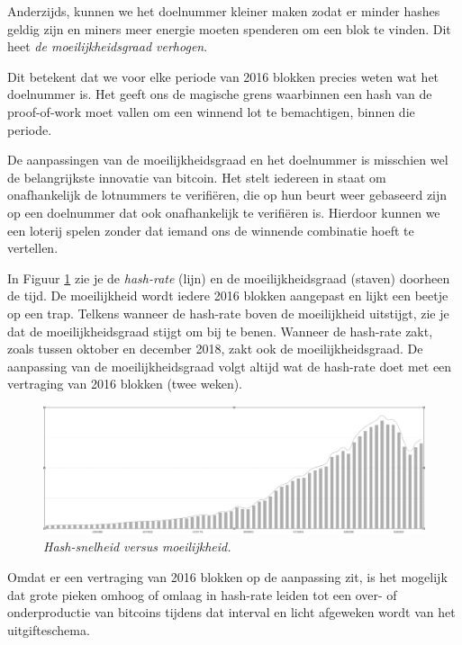 Anderzijds, kunnen we het doelnummer kleiner maken zodat er minder hashes geldig zijn en miners meer energie moeten spenderen om een blok te vinden. Dit heet \textit{de moeilijkheidsgraad verhogen}.

Dit betekent dat we voor elke periode van 2016 blokken precies weten wat het doelnummer is. Het geeft ons de magische grens waarbinnen een hash van de proof-of-work moet vallen om een winnend lot te bemachtigen, binnen die periode.

De aanpassingen van de moeilijkheidsgraad en het doelnummer is misschien wel de belangrijkste innovatie van bitcoin. Het stelt iedereen in staat om onafhankelijk de lotnummers te verifiëren, die op hun beurt weer gebaseerd zijn op een doelnummer dat ook onafhankelijk te verifiëren is. Hierdoor kunnen we een loterij spelen zonder dat iemand ons de winnende combinatie hoeft te vertellen.



In Figuur \ref{fig10} zie je de \textit{hash-rate} (lijn) en de moeilijkheidsgraad (staven) doorheen de tijd. De moeilijkheid wordt iedere 2016 blokken aangepast en lijkt een beetje op een trap. Telkens wanneer de hash-rate boven de moeilijkheid uitstijgt, zie je dat de moeilijkheidsgraad stijgt om bij te benen. Wanneer de hash-rate zakt, zoals tussen oktober en december 2018, zakt ook de moeilijkheidsgraad. De aanpassing van de moeilijkheidsgraad volgt altijd wat de hash-rate doet met een vertraging van 2016 blokken (twee weken).

\begin{figure}
    \centering
    \includegraphics[width=\textwidth]{images/fig10.png}
    \caption{\footnotesize{\textit{Hash-snelheid versus moeilijkheid.}}}
    \label{fig10}
\end{figure}

Omdat er een vertraging van 2016 blokken op de aanpassing zit, is het mogelijk dat grote pieken omhoog of omlaag in hash-rate leiden tot een over- of onderproductie van bitcoins tijdens dat interval en licht afgeweken wordt van het uitgifteschema.


